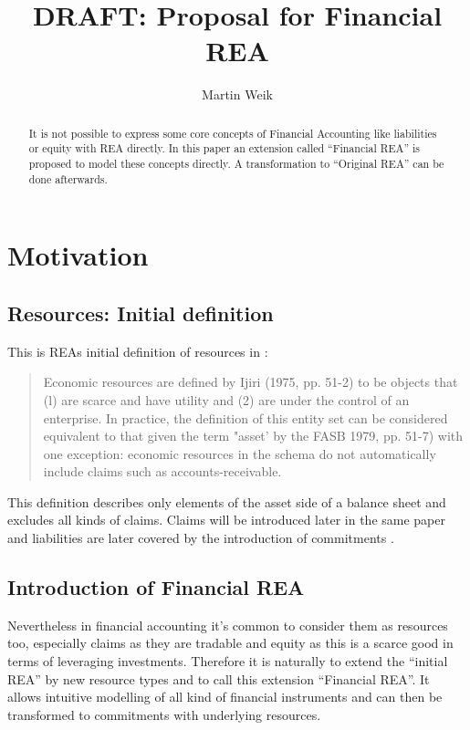 \documentclass[10pt,paper=a4,parskip]{scrartcl}
\author{Martin Weik}
\title{DRAFT: Proposal for Financial REA}
\newif\ifforme
\newcommand{\note}[1]{\unskip\ignorespaces\ifforme\textbf{#1}\else{}\fi}
\begin{document}
\maketitle
\begin{abstract}
It is not possible to express some core concepts of Financial Accounting like liabilities or equity with REA directly.
In this paper an extension called ``Financial REA'' is proposed to model these concepts directly.
A transformation to ``Original REA'' can be done afterwards.
\end{abstract}

\section{Motivation}
\subsection{Resources: Initial definition}
This is REAs initial definition of resources in \cite[p. 562]{mccarthy1982rea}:
\begin{quotation}
Economic resources are defined by Ijiri (1975, pp. 51-2) to be objects that (l) are scarce and have utility and (2) are under the control of an enterprise. In practice, the definition of this entity set can be considered equivalent to that given the term "asset' by the FASB 1979, pp. 51-7) with one exception: economic resources in the schema do not automatically include claims such as accounts-receivable.
\end{quotation}

This definition describes only elements of the asset side of a balance sheet and excludes all kinds of claims. Claims will be introduced later in the same paper and liabilities are later covered by the introduction of commitments \cite{mccarthy2006reapolicy}.
\subsection{Introduction of Financial REA}
\note{Problem 1}
Nevertheless in financial accounting it's common to consider them as resources too, especially claims as they are tradable and equity as this is a scarce good in terms of leveraging investments.
\note{ Need literatur Basel II or Solvency II.}
Therefore it is naturally to extend the ``initial REA'' by new resource types and to call this extension ``Financial REA''. It allows intuitive modelling of all kind of financial instruments and can then be transformed to commitments with underlying resources.
\end{document}
